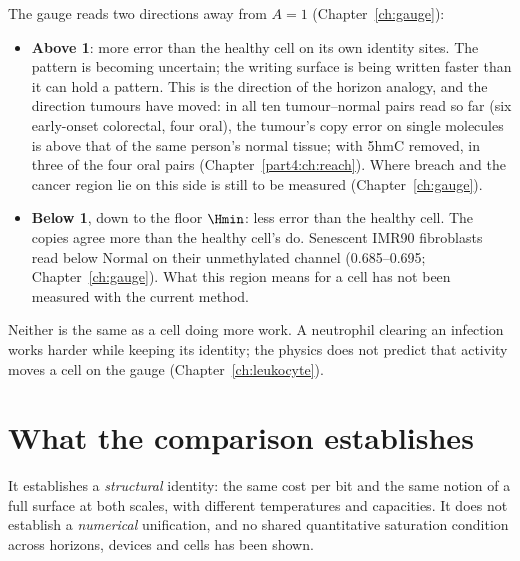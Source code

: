 The gauge reads two directions away from $A=1$ (Chapter~\ref{ch:gauge}):
\begin{itemize}
\item \textbf{Above 1}: more error than the healthy cell on its own identity sites. The pattern is becoming uncertain; the
      writing surface is being written faster than it can hold a pattern. This is the direction of the horizon analogy, and the direction tumours have moved: in all ten tumour--normal pairs read so far (six early-onset colorectal, four oral), the tumour's copy error on
      single molecules is above that of the same person's normal tissue; with 5hmC removed, in three of the four oral pairs
      (Chapter~\ref{part4:ch:reach}). \measured{} Where breach and the cancer
      region lie on this side is still to be measured (Chapter~\ref{ch:gauge}).
\item \textbf{Below 1}, down to the floor $\Hmin$: less error than the healthy cell. The copies agree more than the healthy
      cell's do. Senescent IMR90 fibroblasts read below Normal on their unmethylated channel (0.685--0.695; Chapter~\ref{ch:gauge}).
      \measured{} What this region means for a cell has not been measured with the current method. \openprob
\end{itemize}
Neither is the same as a cell doing more work. A neutrophil clearing an infection works harder while keeping its identity;
the physics does not predict that activity moves a cell on the gauge (Chapter~\ref{ch:leukocyte}).

\section{What the comparison establishes}

It establishes a \emph{structural} identity: the same cost per bit and the same notion of a full surface at both scales,
with different temperatures and capacities. It does not establish a \emph{numerical} unification, and no shared quantitative
saturation condition across horizons, devices and cells has been shown.

